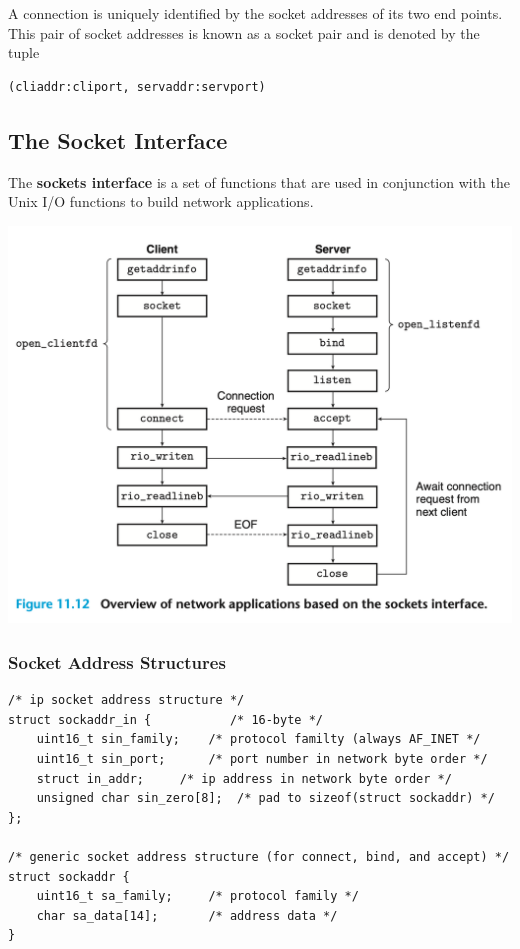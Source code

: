 \documentclass[11pt]{article}
\begin{document}
A connection is uniquely identified by the socket addresses of its two end points. This pair of socket addresses is known as a socket pair and is denoted by the tuple\\
\begin{verbatim}
(cliaddr:cliport, servaddr:servport)
\end{verbatim}



\subsection{The Socket Interface}
\label{sec:org466596f}
The \textbf{sockets interface} is a set of functions that are used in conjunction with the Unix I/O functions to build network applications.\\

\begin{center}
\includegraphics[width=.9\linewidth]{pics/figure11.12-overview-of-network-application-based-on-the-socket-interface.png}
\end{center}

\subsubsection{Socket Address Structures}
\label{sec:org5e44d94}

\begin{verbatim}
/* ip socket address structure */
struct sockaddr_in {	       /* 16-byte */
    uint16_t sin_family;	/* protocol familty (always AF_INET */
    uint16_t sin_port;		/* port number in network byte order */
    struct in_addr;		/* ip address in network byte order */
    unsigned char sin_zero[8];	/* pad to sizeof(struct sockaddr) */
};

/* generic socket address structure (for connect, bind, and accept) */
struct sockaddr {
    uint16_t sa_family;		/* protocol family */
    char sa_data[14];		/* address data */
}


\end{verbatim}
\end{document}
